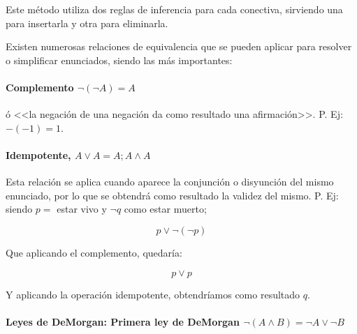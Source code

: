 \documentclass[a4paper, 11pt, titlepage]{article}
\begin{document}
            Este método utiliza dos reglas de inferencia para cada conectiva, sirviendo una para 
            insertarla y otra para eliminarla.

            Existen numerosas relaciones de equivalencia que se pueden aplicar para resolver 
            o simplificar enunciados, siendo las más importantes:

            \paragraph{Complemento $\neg(\neg A) = A$} ó <<la negación de una negación da como 
            resultado una afirmación>>. P. Ej: $-(-1) = 1$.

            \paragraph{Idempotente, $A \lor A = A; A \land A$} Esta relación se aplica cuando 
            aparece la conjunción o disyunción del mismo enunciado, por lo que se obtendrá como 
            resultado la validez del mismo. P. Ej: siendo $p=$ estar vivo y $\neg q$ como estar muerto;

            \[p \lor \neg (\neg p)\]

            Que aplicando el complemento, quedaría:

            \[p \lor p\]

            Y aplicando la operación idempotente, obtendríamos como resultado $q$.

            \paragraph{Leyes de DeMorgan: Primera ley de DeMorgan $\neg (A \land B) = \neg A \lor \neg B$}
            
\end{document}
